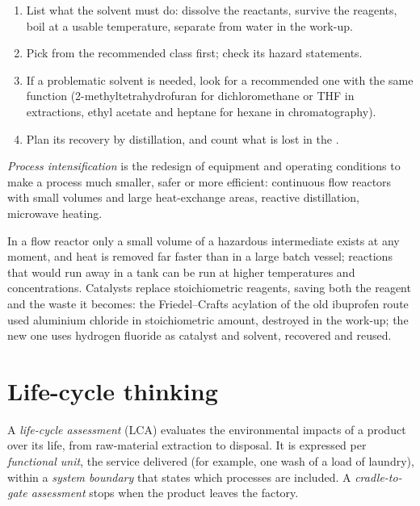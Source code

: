 \begin{method}\label{met:b3:green-industrial:solvent-choice}
\begin{enumerate}
  \item List what the solvent must do: dissolve the reactants, survive the reagents,
        boil at a usable temperature, separate from water in the work-up.
  \item Pick from the recommended class first; check its hazard statements.
  \item If a problematic solvent is needed, look for a recommended one with the same
        function (2-methyltetrahydrofuran for dichloromethane or THF in
        extractions, ethyl acetate and heptane for hexane in chromatography).
  \item Plan its recovery by distillation, and count what is lost in the .
\end{enumerate}
\end{method}

\begin{definition}\label{def:b3:green-industrial:intensification}
\emph{Process intensification} is the
redesign of equipment and operating conditions to make a process much smaller,
safer or more efficient: continuous flow reactors with small volumes and
large heat-exchange areas, reactive distillation, microwave heating.
\end{definition}

In a flow reactor only a small volume of a hazardous intermediate exists at any
moment, and heat is removed far faster than in a large batch vessel; reactions
that would run away in a tank can be run at higher temperatures and
concentrations. Catalysts replace stoichiometric reagents, saving both the
reagent and the waste it becomes: the Friedel--Crafts acylation of the old
ibuprofen route used aluminium chloride in stoichiometric amount, destroyed in
the work-up; the new one uses hydrogen fluoride as catalyst and solvent,
recovered and reused.

\section{Life-cycle thinking}

\begin{definition}\label{def:b3:green-industrial:lca}
A \emph{life-cycle assessment} (LCA) evaluates the
environmental impacts of a product over its life, from raw-material extraction
to disposal. It is expressed per \emph{functional unit},
the service delivered (for example, one wash of a load of laundry), within a
\emph{system boundary} that states which processes are
included. A \emph{cradle-to-gate assessment}
stops when the product leaves the factory.
\end{definition}

